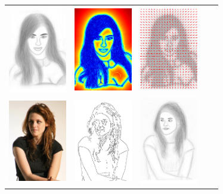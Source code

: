 \begin{figure}
\begin{tabular}{ccccc}
\includegraphics[width=1in]    {figures/imagetable/avg_kk.png} &
\includegraphics[width=1in]   {figures/imagetable/mag_kk.png} &
\includegraphics[width=1in]     {figures/imagetable/dir_kk.png} \\
\includegraphics[width=1in]{figures/imagetable/image_ks.png} &
\includegraphics[width=1in]{figures/imagetable/edges_ks.png} &
\includegraphics[width=1in]    {figures/imagetable/avg_ks.png} &

\end{tabular}
\end{figure}
